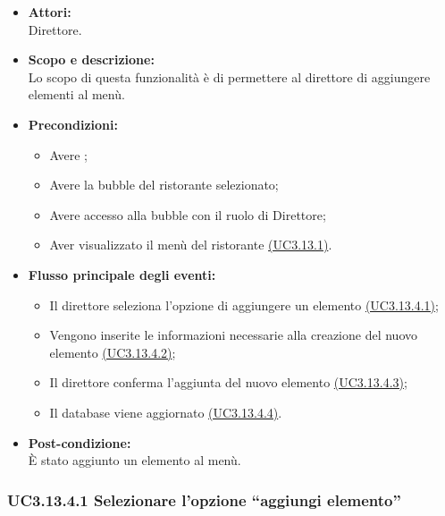 \begin{itemize}
	\item \textbf{Attori:}
	\\Direttore.
	\item \textbf{Scopo e descrizione:} 
	\\Lo scopo di questa funzionalità è di permettere al direttore di aggiungere elementi al menù.
	\item \textbf{Precondizioni:}
	\begin{itemize}
		\item Avere ;
		\item Avere la bubble del ristorante selezionato;
		\item Avere accesso alla bubble con il ruolo di Direttore;
		\item Aver visualizzato il menù del ristorante \hyperref[UC3.13.1]{(UC3.13.1)}.
	\end{itemize}
	\item \textbf{Flusso principale degli eventi:}
	\begin{itemize}
		\item Il direttore seleziona l’opzione di aggiungere un elemento \hyperref[UC3.13.4.1]{(UC3.13.4.1)};
		\item Vengono inserite le informazioni necessarie alla creazione del nuovo elemento \hyperref[UC3.13.4.2]{(UC3.13.4.2)};
		\item Il direttore conferma l’aggiunta del nuovo elemento \hyperref[UC3.13.4.3]{(UC3.13.4.3)};
		\item Il database viene aggiornato \hyperref[UC3.13.4.4]{(UC3.13.4.4)}.
	\end{itemize}
	\item \textbf{Post-condizione:}
	\\È stato aggiunto un elemento al menù.
\end{itemize}

\subsubsection{UC3.13.4.1 Selezionare l’opzione “aggiungi elemento”} \label{UC3.13.4.1}


